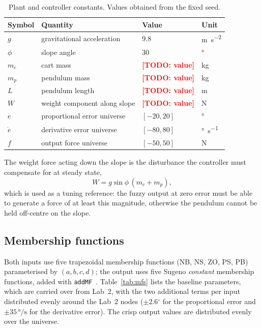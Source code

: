 \documentclass[11pt,a4paper]{article}
\newcommand{\todo}[1]{\textcolor{red}{\textbf{[TODO: #1]}}}
\newcommand{\degC}{\ensuremath{^\circ}}
\begin{document}
\begin{table}[H]
\centering
\small
\begin{tabular}{@{}llll@{}}
\toprule
\textbf{Symbol} & \textbf{Quantity} & \textbf{Value} & \textbf{Unit} \\
\midrule
$g$            & gravitational acceleration & 9.8 & \si{\m\per\s\squared} \\
$\phi$         & slope angle                & 30  & \si{\degree} \\
$m_c$          & cart mass                  & \todo{value} & \si{\kg} \\
$m_p$          & pendulum mass              & \todo{value} & \si{\kg} \\
$L$            & pendulum length            & \todo{value} & \si{\m} \\
$W$            & weight component along slope & \todo{value} & \si{\N} \\
$e$            & proportional error universe & $[-20, 20]$ & \si{\degree} \\
$\dot e$       & derivative error universe   & $[-80, 80]$ & \si{\degree\per\s} \\
$f$            & output force universe       & $[-50, 50]$ & \si{\N} \\
\bottomrule
\end{tabular}
\caption{Plant and controller constants. Values obtained from the fixed seed.}
\label{tab:constants}
\end{table}

The weight force acting down the slope is the disturbance the controller must
compensate for at steady state,
\begin{equation}
  W = g \sin\phi \, (m_c + m_p),
  \label{eq:weight}
\end{equation}
which is used as a tuning reference: the fuzzy output at zero error must be
able to generate a force of at least this magnitude, otherwise the pendulum
cannot be held off-centre on the slope.

\subsection{Membership functions}
\label{sec:mfs}

Both inputs use five trapezoidal membership functions (NB, NS, ZO, PS, PB)
parameterised by $(a,b,c,d)$; the output uses five Sugeno \emph{constant}
membership functions, added with \texttt{addMF}~\cite{mathworks_sugfis}. Table~\ref{tab:mfs} lists the baseline parameters, which
are carried over from Lab~2, with the two additional terms per input
distributed evenly around the Lab~2 nodes ($\pm 2.6\degC$ for the proportional
error and $\pm 35\,\si{\degree\per\s}$ for the derivative error). The crisp output
values are distributed evenly over the universe.
\end{document}
